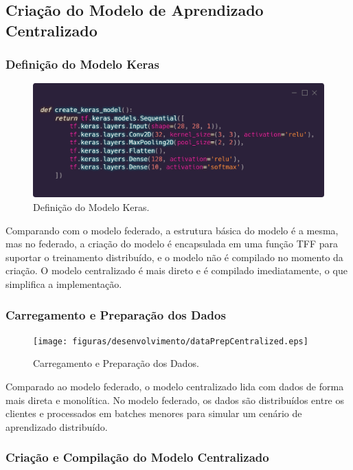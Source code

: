 \subsection{Criação do Modelo de Aprendizado Centralizado}

\subsubsection{Definição do Modelo Keras}

\begin{figure}[ht]
    \centering
    \includegraphics[scale=0.25]{figuras/desenvolvimento/kerasCentralized.eps}
    \caption{Definição do Modelo Keras.}
    \label{fig:kerasCentralized}
\end{figure}

Comparando com o modelo federado, a estrutura básica do modelo é a mesma, mas no federado, a criação do modelo é encapsulada em uma função TFF para suportar o treinamento distribuído, e o modelo não é compilado no momento da criação. O modelo centralizado é mais direto e é compilado imediatamente, o que simplifica a implementação.

\subsubsection{Carregamento e Preparação dos Dados}

\begin{figure}[ht]
    \centering
    \texttt{[image: figuras/desenvolvimento/dataPrepCentralized.eps]}
    \caption{Carregamento e Preparação dos Dados.}
    \label{fig:dataPrepCentralized}
\end{figure}

Comparado ao modelo federado, o modelo centralizado lida com dados de forma mais direta e monolítica. No modelo federado, os dados são distribuídos entre os clientes e processados em batches menores para simular um cenário de aprendizado distribuído.

\subsubsection{Criação e Compilação do Modelo Centralizado}

